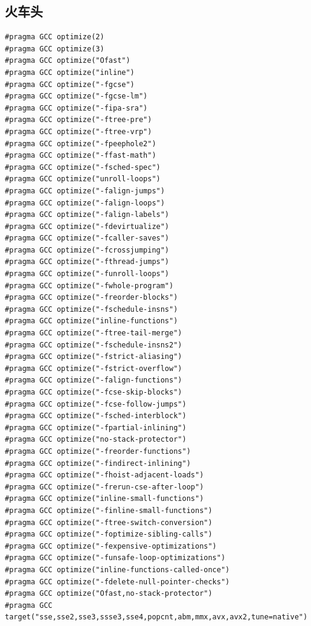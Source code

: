 \documentclass[a4]{ctexart}
\begin{document}
\subsection{火车头}
\begin{lstlisting}
#pragma GCC optimize(2)
#pragma GCC optimize(3)
#pragma GCC optimize("Ofast")
#pragma GCC optimize("inline")
#pragma GCC optimize("-fgcse")
#pragma GCC optimize("-fgcse-lm")
#pragma GCC optimize("-fipa-sra")
#pragma GCC optimize("-ftree-pre")
#pragma GCC optimize("-ftree-vrp")
#pragma GCC optimize("-fpeephole2")
#pragma GCC optimize("-ffast-math")
#pragma GCC optimize("-fsched-spec")
#pragma GCC optimize("unroll-loops")
#pragma GCC optimize("-falign-jumps")
#pragma GCC optimize("-falign-loops")
#pragma GCC optimize("-falign-labels")
#pragma GCC optimize("-fdevirtualize")
#pragma GCC optimize("-fcaller-saves")
#pragma GCC optimize("-fcrossjumping")
#pragma GCC optimize("-fthread-jumps")
#pragma GCC optimize("-funroll-loops")
#pragma GCC optimize("-fwhole-program")
#pragma GCC optimize("-freorder-blocks")
#pragma GCC optimize("-fschedule-insns")
#pragma GCC optimize("inline-functions")
#pragma GCC optimize("-ftree-tail-merge")
#pragma GCC optimize("-fschedule-insns2")
#pragma GCC optimize("-fstrict-aliasing")
#pragma GCC optimize("-fstrict-overflow")
#pragma GCC optimize("-falign-functions")
#pragma GCC optimize("-fcse-skip-blocks")
#pragma GCC optimize("-fcse-follow-jumps")
#pragma GCC optimize("-fsched-interblock")
#pragma GCC optimize("-fpartial-inlining")
#pragma GCC optimize("no-stack-protector")
#pragma GCC optimize("-freorder-functions")
#pragma GCC optimize("-findirect-inlining")
#pragma GCC optimize("-fhoist-adjacent-loads")
#pragma GCC optimize("-frerun-cse-after-loop")
#pragma GCC optimize("inline-small-functions")
#pragma GCC optimize("-finline-small-functions")
#pragma GCC optimize("-ftree-switch-conversion")
#pragma GCC optimize("-foptimize-sibling-calls")
#pragma GCC optimize("-fexpensive-optimizations")
#pragma GCC optimize("-funsafe-loop-optimizations")
#pragma GCC optimize("inline-functions-called-once")
#pragma GCC optimize("-fdelete-null-pointer-checks")
#pragma GCC optimize("Ofast,no-stack-protector")
#pragma GCC target("sse,sse2,sse3,ssse3,sse4,popcnt,abm,mmx,avx,avx2,tune=native")
\end{lstlisting}
\end{document}
